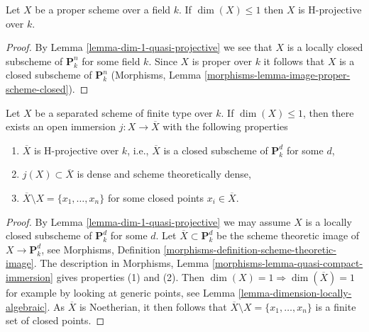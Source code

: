 \begin{lemma}
\label{lemma-dim-1-proper-projective}
Let $X$ be a proper scheme over a field $k$.
If $\dim(X) \leq 1$ then $X$ is H-projective over $k$.
\end{lemma}

\begin{proof}
By Lemma \ref{lemma-dim-1-quasi-projective} we see that $X$ is a
locally closed subscheme of $\mathbf{P}^n_k$ for some field $k$.
Since $X$ is proper over $k$ it follows that $X$ is a closed subscheme
of $\mathbf{P}^n_k$
(Morphisms, Lemma \ref{morphisms-lemma-image-proper-scheme-closed}).
\end{proof}

\begin{lemma}
\label{lemma-dim-1-projective-completion}
Let $X$ be a separated scheme of finite type over $k$.
If $\dim(X) \leq 1$, then there exists an open immersion
$j : X \to \overline{X}$ with the following properties
\begin{enumerate}
\item $\overline{X}$ is H-projective over $k$, i.e., $\overline{X}$
is a closed subscheme of $\mathbf{P}^d_k$ for some $d$,
\item $j(X) \subset \overline{X}$ is dense and scheme
theoretically dense,
\item $\overline{X} \setminus X = \{x_1, \ldots, x_n\}$
for some closed points $x_i \in \overline{X}$.
\end{enumerate}
\end{lemma}

\begin{proof}
By Lemma \ref{lemma-dim-1-quasi-projective} we may assume $X$ is a
locally closed subscheme of $\mathbf{P}^d_k$ for some $d$. Let
$\overline{X} \subset \mathbf{P}^d_k$ be the scheme theoretic image
of $X \to \mathbf{P}^d_k$, see Morphisms, Definition
\ref{morphisms-definition-scheme-theoretic-image}.
The description in
Morphisms, Lemma \ref{morphisms-lemma-quasi-compact-immersion}
gives properties (1) and (2).
Then $\dim(X) = 1 \Rightarrow \dim(\overline{X}) = 1$ for example by
looking at generic points, see
Lemma \ref{lemma-dimension-locally-algebraic}.
As $\overline{X}$ is Noetherian, it then
follows that $\overline{X} \setminus X = \{x_1, \ldots, x_n\}$
is a finite set of closed points.
\end{proof}

